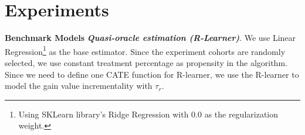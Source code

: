 \documentclass{article}
\begin{document}


\section{Experiments} 

\textbf{Benchmark Models} 
\emph{\textbf{Quasi-oracle estimation (R-Learner)}}. We use Linear Regression\footnote{Using SKLearn library's Ridge Regression with 0.0 as the regularization weight.} as the base estimator. Since the experiment cohorts are randomly selected, we use constant treatment percentage as propensity in the algorithm. Since we need to define one CATE function for R-learner, we use the R-learner to model the gain value incrementality with $\tau_r$. 
\end{document}
